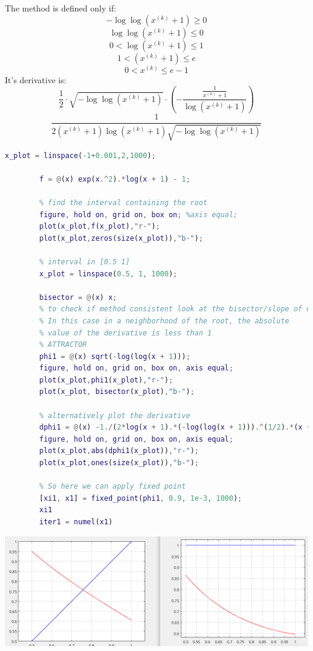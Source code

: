         The method is defined only if:
        $$
        -\log\log\left(x^{(k)}+1\right) \geq 0
        $$
        $$
        \log\log\left(x^{(k)}+1\right) \leq 0
        $$
        $$
        0<\log\left(x^{(k)}+1\right) \leq 1
        $$
        $$
        1<\left(x^{(k)}+1\right) \leq e
        $$
        $$
        0<x^{(k)} \leq e-1
        $$
        It's derivative is:
        $$
        \frac{1}{2}\cdot
        \sqrt{-\log\log\left(x^{(k)}+1\right)}
        \cdot
        \left(
            -\frac{
                \frac{
                    1
                }{
                    x^{(k)}+1
                }
            }{\log\left(x^{(k)}+1\right)}
        \right)
        $$
        $$
        \frac{1}{
            2
            \left(x^{(k)}+1\right)
            \log\left(x^{(k)}+1\right)
            \sqrt{-\log\log\left(x^{(k)}+1\right)}
        }
        $$
        \begin{lstlisting}[language=Matlab, escapeinside=`', gobble=8]
        x_plot = linspace(-1+0.001,2,1000);

        f = @(x) exp(x.^2).*log(x + 1) - 1;

        % find the interval containing the root
        figure, hold on, grid on, box on; %axis equal;
        plot(x_plot,f(x_plot),"r-");
        plot(x_plot,zeros(size(x_plot)),"b-");

        % interval in [0.5 1]
        x_plot = linspace(0.5, 1, 1000);

        bisector = @(x) x;
        % to check if method consistent look at the bisector/slope of derivative
        % In this case in a neighborhood of the root, the absolute
        % value of the derivative is less than 1
        % ATTRACTOR
        phi1 = @(x) sqrt(-log(log(x + 1)));
        figure, hold on, grid on, box on, axis equal;
        plot(x_plot,phi1(x_plot),"r-");
        plot(x_plot, bisector(x_plot),"b-");

        % alternatively plot the derivative
        dphi1 = @(x) -1./(2*log(x + 1).*(-log(log(x + 1))).^(1/2).*(x + 1));
        figure, hold on, grid on, box on, axis equal;
        plot(x_plot,abs(dphi1(x_plot)),"r-");
        plot(x_plot,ones(size(x_plot)),"b-");

        % So here we can apply fixed point
        [xi1, x1] = fixed_point(phi1, 0.9, 1e-3, 1000);
        xi1
        iter1 = numel(x1)
        \end{lstlisting}
        \begin{center}
            \includegraphics[width=1\textwidth]{images/code_fixed_bisector.png}            
        \end{center}

